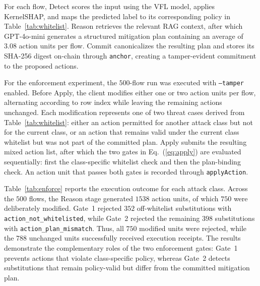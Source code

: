 \documentclass[10pt, conference]{IEEEtran}
\begin{document}
For each flow, Detect scores the input using the VFL model, applies KernelSHAP, and maps the predicted label to its corresponding policy in Table~\ref{tab:whitelist}. Reason retrieves the relevant RAG context, after which GPT-4o-mini generates a structured mitigation plan containing an average of $3.08$ action units per flow. Commit canonicalizes the resulting plan and stores its SHA-256 digest on-chain through \texttt{anchor}, creating a tamper-evident commitment to the proposed actions.

For the enforcement experiment, the $500$-flow run was executed with \texttt{--tamper} enabled. Before Apply, the client modifies either one or two action units per flow, alternating according to row index while leaving the remaining actions unchanged. Each modification represents one of two threat cases derived from Table~\ref{tab:whitelist}: either an action permitted for another attack class but not for the current class, or an action that remains valid under the current class whitelist but was not part of the committed plan. Apply submits the resulting mixed action list, after which the two gates in Eq.~(\ref{eq:apply}) are evaluated sequentially: first the class-specific whitelist check and then the plan-binding check. An action unit that passes both gates is recorded through \texttt{applyAction}.

Table~\ref{tab:enforce} reports the execution outcome for each attack class. Across the $500$ flows, the Reason stage generated $1538$ action units, of which $750$ were deliberately modified. Gate~1 rejected $352$ off-whitelist substitutions with \texttt{action\_not\_whitelisted}, while Gate~2 rejected the remaining $398$ substitutions with \texttt{action\_plan\_mismatch}. Thus, all $750$ modified units were rejected, while the $788$ unchanged units successfully received execution receipts. The results demonstrate the complementary roles of the two enforcement gates: Gate~1 prevents actions that violate class-specific policy, whereas Gate~2 detects substitutions that remain policy-valid but differ from the committed mitigation plan.
\end{document}
